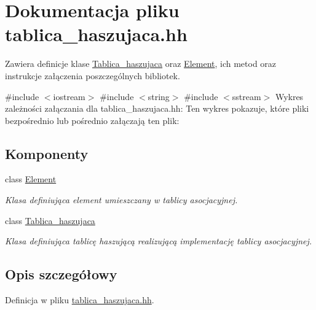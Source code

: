 \hypertarget{tablica__haszujaca_8hh}{\section{\-Dokumentacja pliku tablica\-\_\-haszujaca.\-hh}
\label{tablica__haszujaca_8hh}
}


\-Zawiera definicje klase \hyperlink{class_tablica__haszujaca}{\-Tablica\-\_\-haszujaca} oraz \hyperlink{class_element}{\-Element}, ich metod oraz instrukcje załączenia poszczególnych bibliotek.  


{\ttfamily \#include $<$iostream$>$}\*
{\ttfamily \#include $<$string$>$}\*
{\ttfamily \#include $<$sstream$>$}\*
\-Wykres zależności załączania dla tablica\-\_\-haszujaca.\-hh\-:
\-Ten wykres pokazuje, które pliki bezpośrednio lub pośrednio załączają ten plik\-:
\subsection*{\-Komponenty}
\begin{DoxyCompactItemize}
\item 
class \hyperlink{class_element}{\-Element}
\begin{DoxyCompactList}\small\item\em \-Klasa definiująca element umieszczany w tablicy asocjacyjnej. \end{DoxyCompactList}\item 
class \hyperlink{class_tablica__haszujaca}{\-Tablica\-\_\-haszujaca}
\begin{DoxyCompactList}\small\item\em \-Klasa definiująca tablicę haszującą realizującą implementację tablicy asocjacyjnej. \end{DoxyCompactList}\end{DoxyCompactItemize}


\subsection{\-Opis szczegółowy}


\-Definicja w pliku \hyperlink{tablica__haszujaca_8hh_source}{tablica\-\_\-haszujaca.\-hh}.

